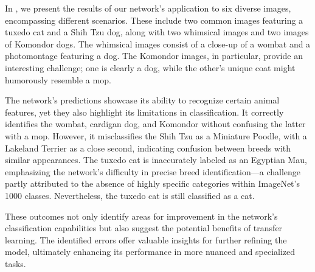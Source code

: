 In , we present the results of our network's application to six diverse images, encompassing different scenarios. These include two common images featuring a tuxedo cat and a Shih Tzu dog, along with two whimsical images and two images of Komondor dogs. The whimsical images consist of a close-up of a wombat and a photomontage featuring a dog. The Komondor images, in particular, provide an interesting challenge; one is clearly a dog, while the other's unique coat might humorously resemble a mop.

The network's predictions showcase its ability to recognize certain animal features, yet they also highlight its limitations in classification. It correctly identifies the wombat, cardigan dog, and Komondor without confusing the latter with a mop. However, it misclassifies the Shih Tzu as a Miniature Poodle, with a Lakeland Terrier as a close second, indicating confusion between breeds with similar appearances. The tuxedo cat is inaccurately labeled as an Egyptian Mau, emphasizing the network's difficulty in precise breed identification—a challenge partly attributed to the absence of highly specific categories within ImageNet's 1000 classes. Nevertheless, the tuxedo cat is still classified as a cat.

These outcomes not only identify areas for improvement in the network's classification capabilities but also suggest the potential benefits of transfer learning. The identified errors offer valuable insights for further refining the model, ultimately enhancing its performance in more nuanced and specialized tasks.


